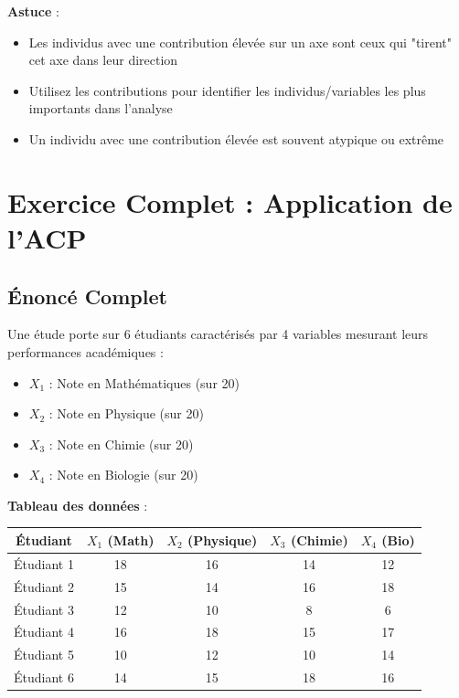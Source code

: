 \documentclass[11pt,a4paper]{article}
\begin{document}
\begin{astucebox}
\textbf{Astuce} : 
\begin{itemize}
    \item Les individus avec une contribution élevée sur un axe sont ceux qui "tirent" cet axe dans leur direction
    \item Utilisez les contributions pour identifier les individus/variables les plus importants dans l'analyse
    \item Un individu avec une contribution élevée est souvent atypique ou extrême
\end{itemize}
\end{astucebox}

\newpage

\section{Exercice Complet : Application de l'ACP}

\subsection{Énoncé Complet}

Une étude porte sur 6 étudiants caractérisés par 4 variables mesurant leurs performances académiques :
\begin{itemize}
    \item $X_1$ : Note en Mathématiques (sur 20)
    \item $X_2$ : Note en Physique (sur 20)
    \item $X_3$ : Note en Chimie (sur 20)
    \item $X_4$ : Note en Biologie (sur 20)
\end{itemize}

\textbf{Tableau des données} :

\begin{table}[h]
\centering
\begin{tabular}{|c|c|c|c|c|}
\hline
\textbf{Étudiant} & $X_1$ (Math) & $X_2$ (Physique) & $X_3$ (Chimie) & $X_4$ (Bio) \\
\hline
Étudiant 1 & 18 & 16 & 14 & 12 \\
\hline
Étudiant 2 & 15 & 14 & 16 & 18 \\
\hline
Étudiant 3 & 12 & 10 & 8 & 6 \\
\hline
Étudiant 4 & 16 & 18 & 15 & 17 \\
\hline
Étudiant 5 & 10 & 12 & 10 & 14 \\
\hline
Étudiant 6 & 14 & 15 & 18 & 16 \\
\hline
\end{tabular}
\end{table}
\end{document}
